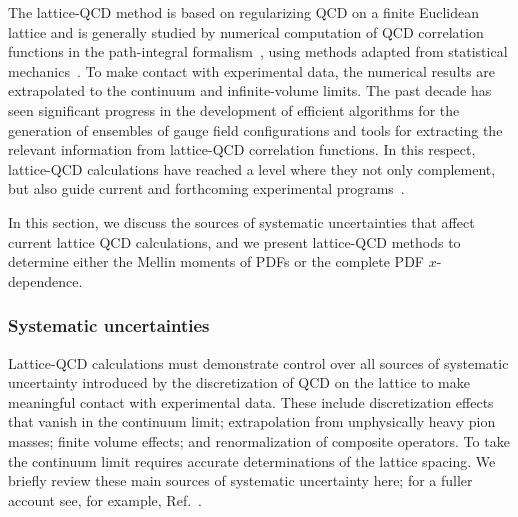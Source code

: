 The lattice-QCD method is based on regularizing QCD on a finite Euclidean 
lattice and is generally studied by numerical computation of QCD correlation 
functions in the path-integral formalism~\cite{DiPierro:2000nt,Lepage:1998dt,
Luscher:1998pe,Gupta:1997nd}, using methods adapted from statistical 
mechanics~\cite{Binder:2015klx,Newman:1999mng}.
%
To make contact with experimental data, the numerical results are extrapolated 
to the continuum and infinite-volume limits.
%
The past decade has seen significant progress in the development of efficient 
algorithms for the generation of ensembles of gauge field configurations and 
tools for extracting the relevant information from lattice-QCD
correlation functions.
%
In this respect, lattice-QCD calculations have reached a level where
they not only complement, but also guide current and forthcoming
experimental programs~\cite{Brodsky:2015aia,Aschenauer:2014twa}.

In this section, we discuss the sources of systematic uncertainties
that affect current lattice QCD calculations, and we present 
lattice-QCD methods to determine either the Mellin moments of PDFs
or the complete PDF $x$-dependence.

\subsubsection{Systematic uncertainties}
Lattice-QCD calculations must demonstrate control over all sources of
systematic uncertainty introduced by the discretization of QCD on the
lattice to make meaningful contact with experimental data.
%
These
include discretization effects that vanish in the continuum limit;
extrapolation from unphysically heavy pion masses; finite volume
effects; and renormalization of composite operators.
%
To take the continuum limit requires accurate determinations of the 
lattice spacing.
% 
We briefly review these main sources of systematic uncertainty here; for a 
fuller account see, for example, Ref.~\cite{Aoki:2016frl}.

